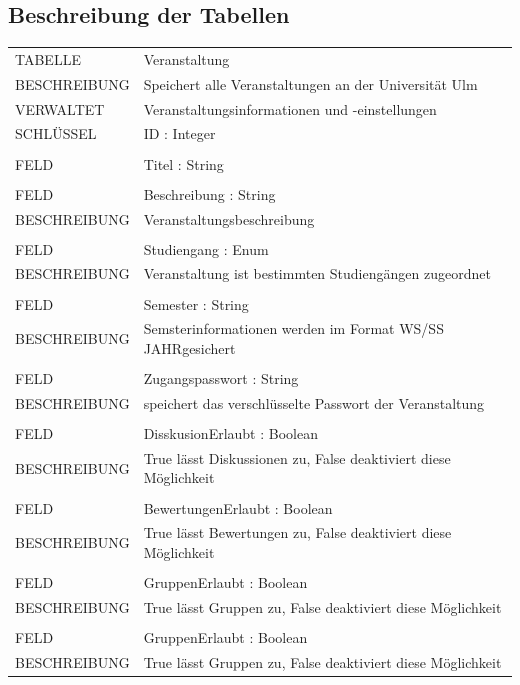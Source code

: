 \documentclass[12pt,a4paper]{article}
\begin{document}
\subsection{Beschreibung der Tabellen}
\begin{tabular}{|lp{12cm}|}
	\hline
	TABELLE			&  Veranstaltung\\ 
	BESCHREIBUNG	&  Speichert alle Veranstaltungen an der Universität Ulm\\ 
	VERWALTET		&  Veranstaltungsinformationen und -einstellungen\\ 
	SCHLÜSSEL		&  ID : Integer\\ 
	\hline
	&  \\ 
	FELD		    &  Titel : String\\  
	&  \\
	FELD		    &  Beschreibung : String\\ 
	BESCHREIBUNG	&  Veranstaltungsbeschreibung\\
	&  \\
	FELD		    &  Studiengang : Enum\\ 
	BESCHREIBUNG	&  Veranstaltung ist bestimmten Studiengängen zugeordnet\\ 
	&  \\
	FELD		    &  Semester : String\\ 
	BESCHREIBUNG	&  Semsterinformationen werden im Format \glqq WS/SS JAHR\grqq gesichert \\
	&  \\
	FELD		    &  Zugangspasswort : String\\ 
	BESCHREIBUNG	&  speichert das verschlüsselte Passwort der Veranstaltung\\
	&  \\
	FELD		    &  DisskusionErlaubt : Boolean\\ 
	BESCHREIBUNG	&  True lässt Diskussionen zu, False deaktiviert diese Möglichkeit \\
	&  \\
	FELD		    &  BewertungenErlaubt : Boolean\\ 
	BESCHREIBUNG	&  True lässt Bewertungen zu, False deaktiviert diese Möglichkeit \\
	&  \\
	FELD		    &  GruppenErlaubt : Boolean\\ 
	BESCHREIBUNG	&  True lässt Gruppen zu, False deaktiviert diese Möglichkeit \\
	&  \\
	FELD		    &  GruppenErlaubt : Boolean\\ 
	BESCHREIBUNG	&  True lässt Gruppen zu, False deaktiviert diese Möglichkeit \\

\end{tabular}
\end{document}
